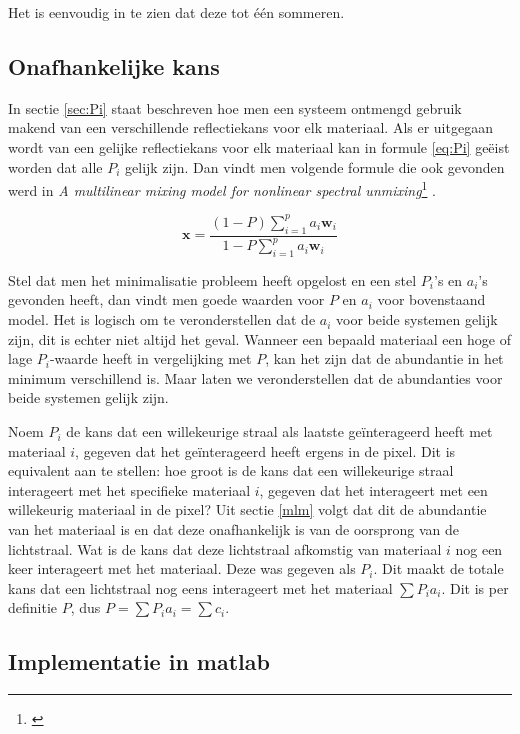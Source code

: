 \documentclass[12pt]{report}
\newcommand{\footcite}[1]{\cite{#1}\let\thefootnote\relax \footnote{\cite{#1} \bibentry{#1}} }
\begin{document}
Het is eenvoudig in te zien dat deze tot \'e\'en sommeren.



\subsection{Onafhankelijke kans} \label{sec:P}

In sectie \ref{sec:Pi} staat beschreven hoe men een systeem ontmengd gebruik makend van een verschillende reflectiekans voor elk materiaal. Als er uitgegaan wordt van een gelijke reflectiekans voor elk materiaal kan in formule \ref{eq:Pi} ge\"eist worden dat alle $P_i$ gelijk zijn. Dan vindt men volgende formule die ook gevonden werd in \textit{A multilinear mixing model for nonlinear spectral unmixing}\footcite{mlinmix}.

\begin{equation}
\bm{x} = \frac{(1-P)\sum_{i=1}^p  a_{i} \bm{w}_{i}}{1-P\sum_{i=1}^p  a_{i} \bm{w}_{i}} 
\end{equation}

Stel dat men het minimalisatie probleem heeft opgelost en een stel $P_i$'s en $a_i$'s gevonden heeft,
dan vindt men goede waarden voor $P$ en $a_i$ voor bovenstaand model. Het is logisch om te veronderstellen dat de $a_i$ voor beide systemen gelijk zijn, dit is echter niet altijd het geval. Wanneer een bepaald materiaal een hoge of lage $P_i$-waarde heeft in vergelijking met $P$, kan het zijn dat de abundantie in het minimum verschillend is. Maar laten we veronderstellen dat de abundanties voor beide systemen gelijk zijn.

Noem $P_i$ de kans dat een willekeurige straal als laatste ge\"interageerd heeft met materiaal $i$, gegeven dat het ge\"interageerd heeft ergens in de pixel. Dit is equivalent aan te stellen: hoe groot is de kans dat een willekeurige straal interageert met het specifieke materiaal $i$, gegeven dat het interageert met een willekeurig materiaal in de pixel? Uit sectie \ref{mlm} volgt dat dit de abundantie van het materiaal is en dat deze onafhankelijk is van de oorsprong van de lichtstraal. Wat is de kans dat deze lichtstraal afkomstig van materiaal $i$ nog een keer interageert met het materiaal. Deze was gegeven als $P_i$. Dit maakt de totale kans dat een lichtstraal nog eens interageert met het materiaal $\sum P_i a_i$. Dit is per definitie $P$, dus $P = \sum P_i a_i = \sum c_i$.


\subsection{Implementatie in matlab}
\end{document}
